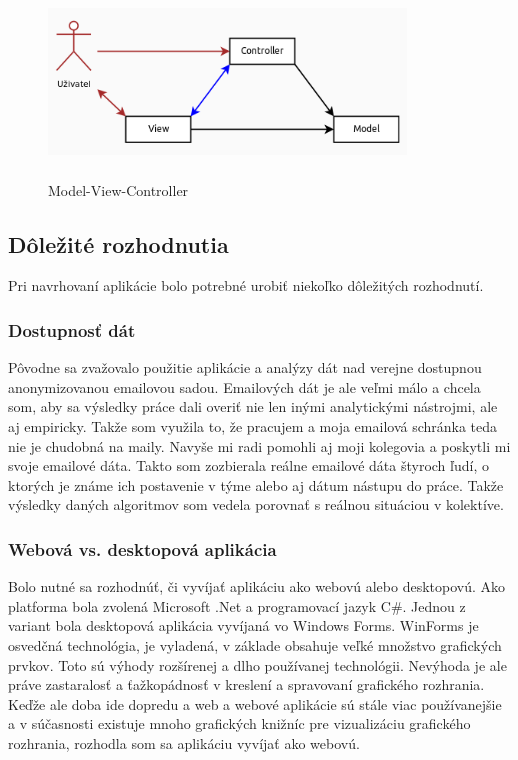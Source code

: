\documentclass[slovak,master,public,dept460,male,cpdeclaration,oneside]{diploma}
\begin{document}
\begin{figure}[H]
\centering
\includegraphics[width=9.5cm, height=5cm]{figures/MVC}
\caption{Model-View-Controller}
\end{figure}


\subsection{Dôležité rozhodnutia}
Pri navrhovaní aplikácie bolo potrebné urobiť niekoľko dôležitých rozhodnutí.

\subsubsection{Dostupnosť dát}
Pôvodne sa zvažovalo použitie aplikácie a analýzy dát nad verejne dostupnou anonymizovanou emailovou sadou. Emailových dát je ale veľmi málo a chcela som, aby sa výsledky práce dali overiť nie len inými analytickými nástrojmi, ale aj empiricky. Takže som využila to, že pracujem a moja emailová schránka teda nie je chudobná na maily. Navyše mi radi pomohli aj moji kolegovia a poskytli mi svoje emailové dáta. Takto som zozbierala reálne emailové dáta štyroch ľudí, o ktorých je známe ich postavenie v týme alebo aj dátum nástupu do práce. Takže výsledky daných algoritmov som vedela porovnať s reálnou situáciou v kolektíve.

\subsubsection{Webová vs. desktopová aplikácia}
Bolo nutné sa rozhodnúť, či vyvíjať aplikáciu ako webovú alebo desktopovú. Ako platforma bola zvolená Microsoft .Net a programovací jazyk C\#. Jednou z variant bola desktopová aplikácia vyvíjaná vo Windows Forms. WinForms je osvedčná technológia, je vyladená, v základe obsahuje veľké množstvo grafických prvkov. Toto sú výhody rozšírenej a dlho používanej technológii. Nevýhoda je ale práve zastaralosť a ťažkopádnosť v kreslení a spravovaní grafického rozhrania. Keďže ale doba ide dopredu a web a webové aplikácie sú stále viac používanejšie a v súčasnosti existuje mnoho grafických knižníc pre vizualizáciu grafického rozhrania, rozhodla som sa aplikáciu vyvíjať ako webovú.
\end{document}
